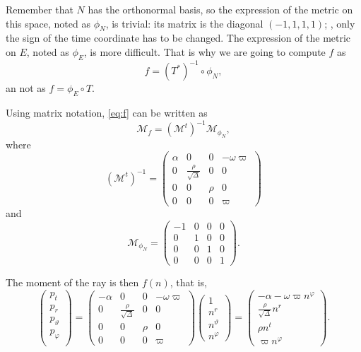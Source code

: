 Remember that $N$ has the orthonormal basis, so the expression of the metric on this space, noted as $\phi_N$, is trivial: its matrix is the diagonal $(-1, 1, 1, 1)$; \ie, only the sign of the time coordinate has to be changed. The expression of the metric on $E$, noted as $\phi_E$, is more difficult. That is why we are going to compute $f$ as
\begin{equation}
\label{eq:f}
f = (T^*)^{-1} \circ \phi_N,
\end{equation}
an not as $f = \phi_E \circ T$.

Using matrix notation, \autoref{eq:f} can be written as
\begin{equation}
\mathcal{M}_f = \left(\mathcal{M}^t\right)^{-1} \mathcal{M}_{\phi_N},
\end{equation}
where
\[
\left(\mathcal{M}^t\right)^{-1} = \begin{pmatrix}
\alpha & 0 & 0 & -\omega\varpi \\
0 & \frac{\rho}{\sqrt{\Delta}} & 0 & 0 \\
0 & 0 & \rho & 0 \\
0 & 0 & 0 & \varpi
\end{pmatrix}
\]
and
\[
\mathcal{M}_{\phi_N} = \begin{pmatrix}
-1 & 0 & 0 & 0\\
0 & 1 & 0 & 0\\
0 & 0 & 1 & 0\\
0 & 0 & 0 & 1
\end{pmatrix}.
\]

The moment of the ray is then $f(n)$, that is,
\begin{equation}
\begin{pmatrix}
p_t \\
p_r \\
p_\vartheta \\
p_\varphi \\
\end{pmatrix} = \begin{pmatrix}
-\alpha & 0 & 0 & -\omega\varpi \\
0 & \frac{\rho}{\sqrt{\Delta}} & 0 & 0 \\
0 & 0 & \rho & 0 \\
0 & 0 & 0 & \varpi
\end{pmatrix}
\begin{pmatrix}
1 \\
n^r \\
n^\vartheta \\
n^\varphi
\end{pmatrix} = \begin{pmatrix}
-\alpha - \omega\varpi n^\varphi \\
\frac{\rho}{\sqrt{\Delta}} n^r \\
\rho n^t \\
\varpi n^\varphi
\end{pmatrix}.
\end{equation}

